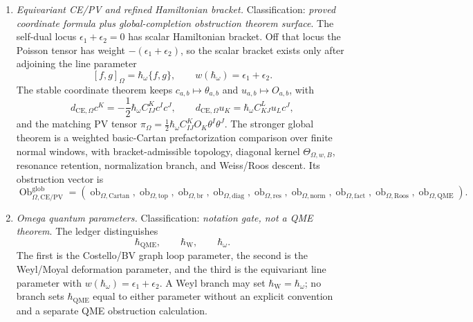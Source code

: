 \begin{enumerate}
  \item \emph{Equivariant CE/PV and refined Hamiltonian bracket.}
  Classification: \emph{proved coordinate formula plus global-completion
  obstruction theorem surface}.
  The self-dual locus \(\epsilon_1+\epsilon_2=0\) has scalar
  Hamiltonian bracket.  Off that locus the Poisson tensor has weight
  \(-(\epsilon_1+\epsilon_2)\), so the scalar bracket exists only after
  adjoining the line parameter
  \[
    [f,g]_\Omega=\hbar_\omega\{f,g\},\qquad
    w(\hbar_\omega)=\epsilon_1+\epsilon_2.
  \]
  The stable coordinate theorem keeps
  \(c_{a,b}\mapsto\theta_{a,b}\) and \(u_{a,b}\mapsto O_{a,b}\), with
  \[
    d_{\mathrm{CE},\Omega}c^K
    =-\frac12\hbar_\omega C^K_{IJ}c^Ic^J,\qquad
    d_{\mathrm{CE},\Omega}u_K
    =\hbar_\omega C^L_{KJ}u_Lc^J,
  \]
  and the matching PV tensor
  \(\pi_\Omega=\frac12\hbar_\omega C^K_{IJ}O_K\theta^I\theta^J\).
  The stronger global theorem is a weighted basic-Cartan
  prefactorization comparison over finite normal windows, with
  bracket-admissible topology, diagonal kernel
  \(\Theta_{\Omega,w,B}\), resonance retention, normalization branch,
  and Weiss/Roos descent.  Its obstruction vector is
  \[
    \operatorname{Ob}^{\mathrm{glob}}_{\Omega,\mathrm{CE/PV}}
    =
    (\operatorname{ob}_{\Omega,\mathrm{Cartan}},
     \operatorname{ob}_{\Omega,\mathrm{top}},
     \operatorname{ob}_{\Omega,\mathrm{br}},
     \operatorname{ob}_{\Omega,\mathrm{diag}},
     \operatorname{ob}_{\Omega,\mathrm{res}},
     \operatorname{ob}_{\Omega,\mathrm{norm}},
     \operatorname{ob}_{\Omega,\mathrm{fact}},
     \operatorname{ob}_{\Omega,\mathrm{Roos}},
     \operatorname{ob}_{\Omega,\mathrm{QME}}).
  \]

  \item \emph{Omega quantum parameters.}
  Classification: \emph{notation gate, not a QME theorem}.  The ledger
  distinguishes
  \[
    \hbar_{\mathrm{QME}},\qquad
    \hbar_{\mathrm{W}},\qquad
    \hbar_\omega .
  \]
  The first is the Costello/BV graph loop parameter, the second is the
  Weyl/Moyal deformation parameter, and the third is the equivariant line
  parameter with \(w(\hbar_\omega)=\epsilon_1+\epsilon_2\).  A Weyl branch
  may set \(\hbar_{\mathrm{W}}=\hbar_\omega\); no branch sets
  \(\hbar_{\mathrm{QME}}\) equal to either parameter without an explicit
  convention and a separate QME obstruction calculation.


\end{enumerate}
